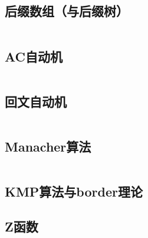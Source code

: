 \documentclass[12pt, a4paper, oneside]{ctexart}
\begin{document}
\begin{multicols}{2}
        \subsection{后缀数组（与后缀树）}
        \inputminted{cpp}{src/string/SA.cpp}
        \subsection{AC自动机}
        \inputminted{cpp}{src/string/ACAM.cpp}
        \subsection{回文自动机}
        \inputminted{cpp}{src/string/PAM.cpp}
        \subsection{Manacher算法}
        \inputminted{cpp}{src/string/manacher.cpp}
        \subsection{KMP算法与border理论}
        
        \subsection{Z函数}
        
    \end{multicols}
\end{document}
